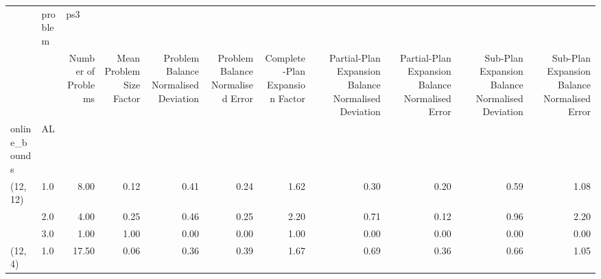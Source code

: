 \begin{tabular}{llrrrrrrrrr}
\toprule
       & problem & \multicolumn{9}{l}{ps3} \\
       & {} & Number of Problems & Mean Problem Size Factor & Problem Balance Normalised Deviation & Problem Balance Normalised Error & Complete-Plan Expansion Factor & Partial-Plan Expansion Balance Normalised Deviation & Partial-Plan Expansion Balance Normalised Error & Sub-Plan Expansion Balance Normalised Deviation & Sub-Plan Expansion Balance Normalised Error \\
online\_bounds & AL &                    &                          &                                      &                                  &                                &                                                     &                                                 &                                                 &                                             \\
\midrule
(12, 12) & 1.0 &               8.00 &                     0.12 &                                 0.41 &                             0.24 &                           1.62 &                                               0.30 &                                            0.20 &                                            0.59 &                                        1.08 \\
       & 2.0 &               4.00 &                     0.25 &                                 0.46 &                             0.25 &                           2.20 &                                               0.71 &                                            0.12 &                                            0.96 &                                        2.20 \\
       & 3.0 &               1.00 &                     1.00 &                                 0.00 &                             0.00 &                           1.00 &                                               0.00 &                                            0.00 &                                            0.00 &                                        0.00 \\
(12, 4) & 1.0 &              17.50 &                     0.06 &                                 0.36 &                             0.39 &                           1.67 &                                               0.69 &                                            0.36 &                                            0.66 &                                        1.05 \\

\end{tabular}
